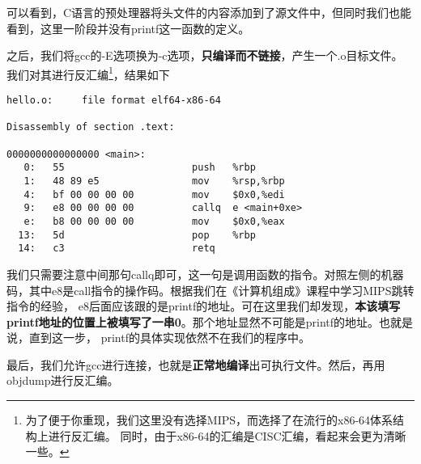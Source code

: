 可以看到，C语言的预处理器将头文件的内容添加到了源文件中，但同时我们也能看到，这里一阶段并没有printf这一函数的定义。

之后，我们将gcc的-E选项换为-c选项，\textbf{只编译而不链接}，产生一个.o目标文件。
我们对其进行反汇编\footnote{为了便于你重现，我们这里没有选择MIPS，而选择了在流行的x86-64体系结构上进行反汇编。
同时，由于x86-64的汇编是CISC汇编，看起来会更为清晰一些。}，结果如下

\begin{verbatim}
hello.o:     file format elf64-x86-64

Disassembly of section .text:

0000000000000000 <main>:
   0:   55                      push   %rbp
   1:   48 89 e5                mov    %rsp,%rbp
   4:   bf 00 00 00 00          mov    $0x0,%edi
   9:   e8 00 00 00 00          callq  e <main+0xe>
   e:   b8 00 00 00 00          mov    $0x0,%eax
  13:   5d                      pop    %rbp
  14:   c3                      retq
\end{verbatim}

我们只需要注意中间那句callq即可，这一句是调用函数的指令。对照左侧的机器码，其中e8是call指令的操作码。根据我们在《计算机组成》课程中学习MIPS跳转指令的经验，
e8后面应该跟的是printf的地址。可在这里我们却发现，\textbf{本该填写printf地址的位置上被填写了一串0}。那个地址显然不可能是printf的地址。也就是说，直到这一步，
printf的具体实现依然不在我们的程序中。

最后，我们允许gcc进行连接，也就是\textbf{正常地编译}出可执行文件。然后，再用objdump进行反汇编。


